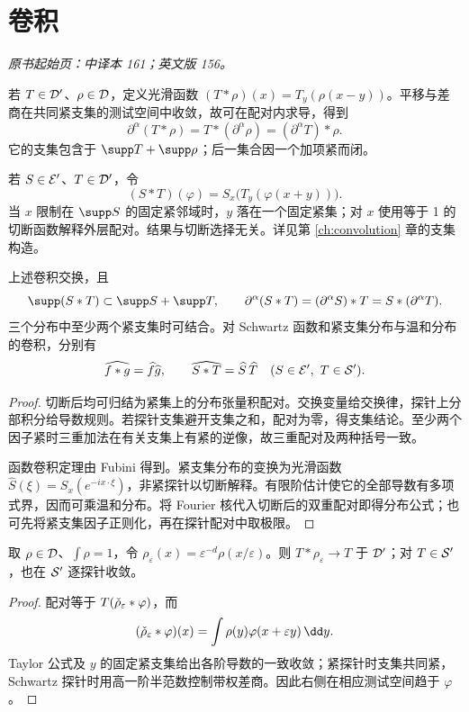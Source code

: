 \section{卷积}\label{sec:yosida-06-03}
\noindent\textit{原书起始页：中译本 161；英文版 156。}

若 $T\in\mathcal{D}'$、$\rho\in\mathcal{D}$，定义光滑函数 $(T*\rho)(x)=T_y(\rho(x-y))$。平移与差商在共同紧支集的测试空间中收敛，故可在配对内求导，得到
\[
 \partial^\alpha(T*\rho)=T*(\partial^\alpha\rho)=(\partial^\alpha T)*\rho.
\]
它的支集包含于 $\supp T+\supp\rho$；后一集合因一个加项紧而闭。

\begin{definition}[至少一个因子紧支集的分布卷积]
若 $S\in\mathcal{E}'$、$T\in\mathcal{D}'$，令
\[
 (S*T)(\varphi)=S_x\bigl(T_y(\varphi(x+y))\bigr).
\]
当 $x$ 限制在 $\supp S$ 的固定紧邻域时，$y$ 落在一个固定紧集；对 $x$ 使用等于 1 的切断函数解释外层配对。结果与切断选择无关。详见第 \ref{ch:convolution} 章的支集构造。
\end{definition}

\begin{proposition}[代数规则与支集控制]\label{prop:y6-convolution}
上述卷积交换，且
\[
 \supp(S*T)\subset\supp S+\supp T,\qquad
 \partial^\alpha(S*T)=(\partial^\alpha S)*T=S*(\partial^\alpha T).
\]
三个分布中至少两个紧支集时可结合。对 Schwartz 函数和紧支集分布与温和分布的卷积，分别有
\[
 \widehat{f*g}=\widehat f\widehat g,\qquad
 \widehat{S*T}=\widehat S\,\widehat T\quad(S\in\CompactDist,\ T\in\Temp).
\]
\end{proposition}
\begin{proof}
切断后均可归结为紧集上的分布张量积配对。交换变量给交换律，探针上分部积分给导数规则。若探针支集避开支集之和，配对为零，得支集结论。至少两个因子紧时三重加法在有关支集上有紧的逆像，故三重配对及两种括号一致。

函数卷积定理由 Fubini 得到。紧支集分布的变换为光滑函数 $\widehat S(\xi)=S_x(e^{-ix\cdot\xi})$，非紧探针以切断解释。有限阶估计使它的全部导数有多项式界，因而可乘温和分布。将 Fourier 核代入切断后的双重配对即得分布公式；也可先将紧支集因子正则化，再在探针配对中取极限。
\end{proof}

\begin{proposition}[正则化与近似恒等]
取 $\rho\in\mathcal{D}$、$\int\rho=1$，令 $\rho_\varepsilon(x)=\varepsilon^{-d}\rho(x/\varepsilon)$。则 $T*\rho_\varepsilon\to T$ 于 $\mathcal{D}'$；对 $T\in\mathcal{S}'$，也在 $\mathcal{S}'$ 逐探针收敛。
\end{proposition}
\begin{proof}
配对等于 $T(\check{\rho}_\varepsilon*\varphi)$，而
\[
 (\Reflected\rho_\varepsilon*\varphi)(x)=\int\rho(y)\varphi(x+\varepsilon y)\,\dd y.
\]
Taylor 公式及 $y$ 的固定紧支集给出各阶导数的一致收敛；紧探针时支集共同紧，Schwartz 探针时用高一阶半范数控制带权差商。因此右侧在相应测试空间趋于 $\varphi$。
\end{proof}

